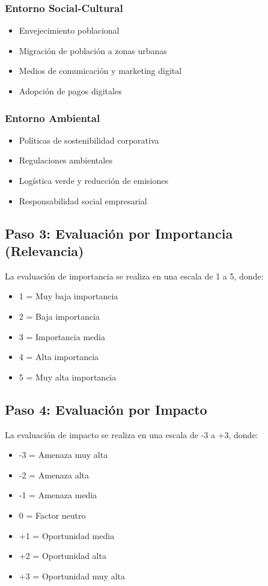\subsubsection{Entorno Social-Cultural}
\begin{itemize}
\item Envejecimiento poblacional
\item Migración de población a zonas urbanas
\item Medios de comunicación y marketing digital
\item Adopción de pagos digitales
\end{itemize}

\subsubsection{Entorno Ambiental}
\begin{itemize}
\item Políticas de sostenibilidad corporativa
\item Regulaciones ambientales
\item Logística verde y reducción de emisiones
\item Responsabilidad social empresarial
\end{itemize}

\subsection{Paso 3: Evaluación por Importancia (Relevancia)}

La evaluación de importancia se realiza en una escala de 1 a 5, donde:
\begin{itemize}
\item 1 = Muy baja importancia
\item 2 = Baja importancia  
\item 3 = Importancia media
\item 4 = Alta importancia
\item 5 = Muy alta importancia
\end{itemize}

\subsection{Paso 4: Evaluación por Impacto}

La evaluación de impacto se realiza en una escala de -3 a +3, donde:
\begin{itemize}
\item -3 = Amenaza muy alta
\item -2 = Amenaza alta
\item -1 = Amenaza media
\item 0 = Factor neutro
\item +1 = Oportunidad media
\item +2 = Oportunidad alta
\item +3 = Oportunidad muy alta
\end{itemize}

